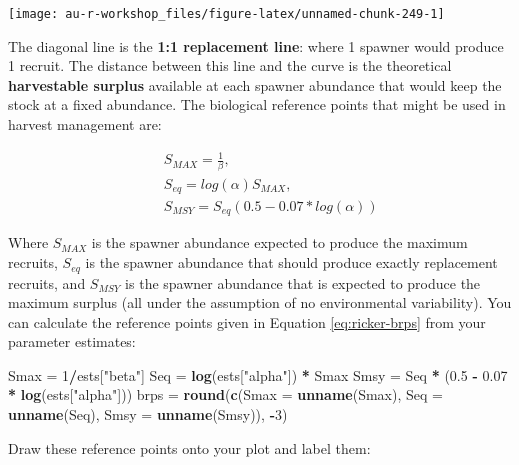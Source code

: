 \documentclass[]{book}
\newenvironment{Shaded}{\begin{snugshade}}{\end{snugshade}}
\newcommand{\KeywordTok}[1]{\textcolor[rgb]{0.13,0.29,0.53}{\textbf{#1}}}
\newcommand{\DataTypeTok}[1]{\textcolor[rgb]{0.13,0.29,0.53}{#1}}
\newcommand{\DecValTok}[1]{\textcolor[rgb]{0.00,0.00,0.81}{#1}}
\newcommand{\FloatTok}[1]{\textcolor[rgb]{0.00,0.00,0.81}{#1}}
\newcommand{\StringTok}[1]{\textcolor[rgb]{0.31,0.60,0.02}{#1}}
\newcommand{\OperatorTok}[1]{\textcolor[rgb]{0.81,0.36,0.00}{\textbf{#1}}}
\newcommand{\NormalTok}[1]{#1}
\theoremstyle{definition}
\theoremstyle{definition}
\theoremstyle{definition}
\theoremstyle{remark}
\begin{document}
\begin{center}\texttt{[image: au-r-workshop\_files/figure-latex/unnamed-chunk-249-1]} \end{center}

The diagonal line is the \textbf{1:1 replacement line}: where 1 spawner
would produce 1 recruit. The distance between this line and the curve is
the theoretical \textbf{harvestable surplus} available at each spawner
abundance that would keep the stock at a fixed abundance. The biological
reference points that might be used in harvest management are:

\begin{eqnarray*}
&& S_{MAX}=\frac{1}{\beta},\\
&& S_{eq}=log(\alpha) S_{MAX},\\
&& S_{MSY}=S_{eq} \left(0.5-0.07*log(\alpha)\right)
\label{eq:ricker-brps}
\end{eqnarray*}

Where \(S_{MAX}\) is the spawner abundance expected to produce the
maximum recruits, \(S_{eq}\) is the spawner abundance that should
produce exactly replacement recruits, and \(S_{MSY}\) is the spawner
abundance that is expected to produce the maximum surplus (all under the
assumption of no environmental variability). You can calculate the
reference points given in Equation \eqref{eq:ricker-brps} from your
parameter estimates:

\begin{Shaded}
\begin{Highlighting}[]
\NormalTok{Smax =}\StringTok{ }\DecValTok{1}\OperatorTok{/}\NormalTok{ests[}\StringTok{"beta"}\NormalTok{]}
\NormalTok{Seq =}\StringTok{ }\KeywordTok{log}\NormalTok{(ests[}\StringTok{"alpha"}\NormalTok{]) }\OperatorTok{*}\StringTok{ }\NormalTok{Smax}
\NormalTok{Smsy =}\StringTok{ }\NormalTok{Seq }\OperatorTok{*}\StringTok{ }\NormalTok{(}\FloatTok{0.5} \OperatorTok{-}\StringTok{ }\FloatTok{0.07} \OperatorTok{*}\StringTok{ }\KeywordTok{log}\NormalTok{(ests[}\StringTok{"alpha"}\NormalTok{]))}
\NormalTok{brps =}\StringTok{ }\KeywordTok{round}\NormalTok{(}\KeywordTok{c}\NormalTok{(}\DataTypeTok{Smax =} \KeywordTok{unname}\NormalTok{(Smax),}
               \DataTypeTok{Seq =} \KeywordTok{unname}\NormalTok{(Seq),}
               \DataTypeTok{Smsy =} \KeywordTok{unname}\NormalTok{(Smsy)), }\OperatorTok{-}\DecValTok{3}\NormalTok{)}
\end{Highlighting}
\end{Shaded}

Draw these reference points onto your plot and label them:
\end{document}
